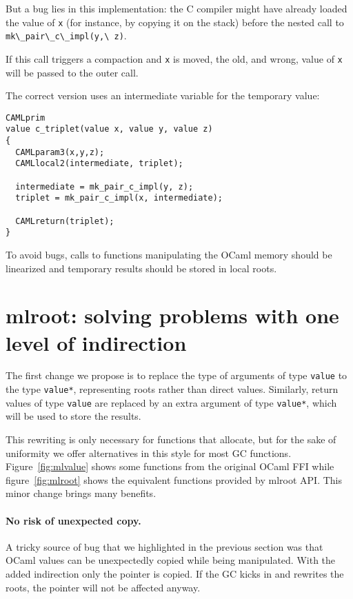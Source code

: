 \documentclass[a4paper]{easychair}
\newcommand{\cpp}[1]{\lstinline[style=C++]{#1}}
\begin{document}
But a bug lies in this implementation: the C compiler might have already
loaded the value of \cpp{x} (for instance, by copying it on the
stack) before the nested call to \cpp{mk\_pair\_c\_impl(y,\ z)}.

If this call triggers a compaction and \cpp{x} is moved, the old,
and wrong, value of \cpp{x} will be passed to the outer call.

The correct version uses an intermediate variable for the temporary
value:
%
\begin{lstlisting}[style=C++]
CAMLprim
value c_triplet(value x, value y, value z)
{
  CAMLparam3(x,y,z);
  CAMLlocal2(intermediate, triplet);

  intermediate = mk_pair_c_impl(y, z);
  triplet = mk_pair_c_impl(x, intermediate);

  CAMLreturn(triplet);
}
\end{lstlisting}

To avoid bugs, calls to functions manipulating the OCaml memory should be
linearized and temporary results should be stored in local roots.

\section{mlroot: solving problems with one level of indirection}

The first change we propose is to replace the type of arguments of type \cpp{value}
to the type \cpp{value*}, representing roots rather than direct values.
Similarly, return values of type \cpp{value} are replaced by an extra argument
of type \cpp{value*}, which will be used to store the results.

This rewriting is only necessary for functions that allocate, but for the sake
of uniformity we offer alternatives in this style for most GC functions.
Figure~\ref{fig:mlvalue} shows some functions from the original OCaml FFI while
figure~\ref{fig:mlroot} shows the equivalent functions provided by mlroot API.
This minor change brings many benefits.

\paragraph{No risk of unexpected copy.}

A tricky source of bug that we highlighted in the previous section was
that OCaml values can be unexpectedly copied while being manipulated. With
the added indirection only the pointer is copied. If the GC kicks in and
rewrites the roots, the pointer will not be affected anyway.
\end{document}

